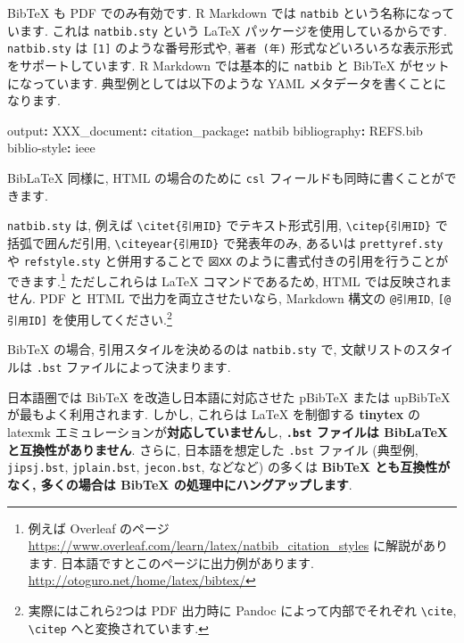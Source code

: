 \documentclass[
]{ltjsarticle}
\newenvironment{Shaded}{\begin{snugshade}}{\end{snugshade}}
\newcommand{\AttributeTok}[1]{\textcolor[rgb]{0.77,0.63,0.00}{#1}}
\newcommand{\FunctionTok}[1]{\textcolor[rgb]{0.00,0.00,0.00}{#1}}
\newcommand{\KeywordTok}[1]{\textcolor[rgb]{0.13,0.29,0.53}{\textbf{#1}}}
\begin{document}
BibTeX も PDF でのみ有効です. R Markdown では \texttt{natbib} という名称になっています. これは \texttt{natbib.sty} という LaTeX パッケージを使用しているからです. \texttt{natbib.sty} は \texttt{{[}1{]}} のような番号形式や, \texttt{著者\ (年)} 形式などいろいろな表示形式をサポートしています. R Markdown では基本的に \texttt{natbib} と BibTeX がセットになっています. 典型例としては以下のような YAML メタデータを書くことになります.

\begin{Shaded}
\begin{Highlighting}[]
\FunctionTok{output}\KeywordTok{:}
\AttributeTok{  }\FunctionTok{XXX\_document}\KeywordTok{:}
\AttributeTok{    }\FunctionTok{citation\_package}\KeywordTok{:}\AttributeTok{ natbib}
\FunctionTok{bibliography}\KeywordTok{:}\AttributeTok{ REFS.bib}
\FunctionTok{biblio{-}style}\KeywordTok{:}\AttributeTok{ ieee}
\end{Highlighting}
\end{Shaded}

BibLaTeX 同様に, HTML の場合のために \texttt{csl} フィールドも同時に書くことができます.

\texttt{natbib.sty} は, 例えば \texttt{\textbackslash{}citet\{引用ID\}} でテキスト形式引用, \texttt{\textbackslash{}citep\{引用ID\}} で括弧で囲んだ引用, \texttt{\textbackslash{}citeyear\{引用ID\}} で発表年のみ, あるいは \texttt{prettyref.sty} や \texttt{refstyle.sty} と併用することで \texttt{図XX} のように書式付きの引用を行うことができます.\footnote{例えば Overleaf のページ \url{https://www.overleaf.com/learn/latex/natbib_citation_styles} に解説があります. 日本語ですとこのページに出力例があります. \url{http://otoguro.net/home/latex/bibtex/}} ただしこれらは LaTeX コマンドであるため, HTML では反映されません. PDF と HTML で出力を両立させたいなら, Markdown 構文の \texttt{@引用ID}, \texttt{{[}@引用ID{]}} を使用してください.\footnote{実際にはこれら2つは PDF 出力時に Pandoc によって内部でそれぞれ \texttt{\textbackslash{}cite}, \texttt{\textbackslash{}citep} へと変換されています.}

BibTeX の場合, 引用スタイルを決めるのは \texttt{natbib.sty} で, 文献リストのスタイルは \texttt{.bst} ファイルによって決まります.

日本語圏では BibTeX を改造し日本語に対応させた pBibTeX または upBibTeX が最もよく利用されます. しかし, これらは LaTeX を制御する \textbf{tinytex} の latexmk エミュレーションが\textbf{対応していません}し, \textbf{\texttt{.bst} ファイルは BibLaTeX と互換性がありません}. さらに, 日本語を想定した \texttt{.bst} ファイル (典型例, \texttt{jipsj.bst}, \texttt{jplain.bst}, \texttt{jecon.bst}, などなど) の多くは \textbf{BibTeX とも互換性がなく, 多くの場合は BibTeX の処理中にハングアップします}.
\end{document}
